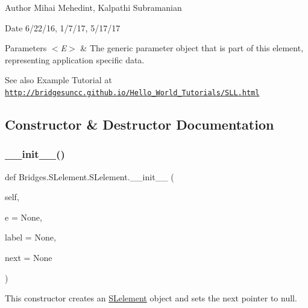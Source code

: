 \begin{DoxyAuthor}{Author}
Mihai Mehedint, Kalpathi Subramanian
\end{DoxyAuthor}
\begin{DoxyDate}{Date}
6/22/16, 1/7/17, 5/17/17
\end{DoxyDate}

\begin{DoxyParams}{Parameters}
{\em $<$\+E$>$} & The generic parameter object that is part of this element, representing application specific data.\\
\hline
\end{DoxyParams}
\begin{DoxySeeAlso}{See also}
Example Tutorial at ~\newline
 \href{http://bridgesuncc.github.io/Hello_World_Tutorials/SLL.html}{\tt http\+://bridgesuncc.\+github.\+io/\+Hello\+\_\+\+World\+\_\+\+Tutorials/\+S\+L\+L.\+html} 
\end{DoxySeeAlso}


\subsection{Constructor \& Destructor Documentation}
\mbox{\label{class_bridges_1_1_s_lelement_1_1_s_lelement_a650ebc16d0b6c365c0f729fd539c6d23}} 
\subsubsection{\texorpdfstring{\+\_\+\+\_\+init\+\_\+\+\_\+()}{\_\_init\_\_()}}
{\footnotesize\ttfamily def Bridges.\+S\+Lelement.\+S\+Lelement.\+\_\+\+\_\+init\+\_\+\+\_\+ (\begin{DoxyParamCaption}\item[{}]{self,  }\item[{}]{e = {\ttfamily None},  }\item[{}]{label = {\ttfamily None},  }\item[{}]{next = {\ttfamily None} }\end{DoxyParamCaption})}



This constructor creates an \mbox{\hyperlink{class_bridges_1_1_s_lelement_1_1_s_lelement}{S\+Lelement}} object and sets the next pointer to null. 


